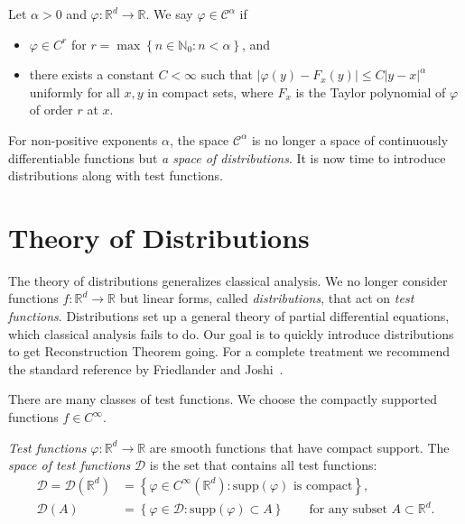 \begin{definition}\label{definition:hoelder-functions}
    Let \(\alpha > 0\) and \(\varphi: \mathbb{R}^d \to \mathbb{R}\). We say \(\varphi \in \mathcal{C}^{\alpha}\) if
\begin{itemize}
    \item \(\varphi \in C^r\) for \(r = \max \left \{ n \in \mathbb{N}_0 : n < \alpha \right \} \), and
    \item there exists a constant \(C < {\infty}\) such that \(|\varphi(y) - F_x(y)| \leq C |y-x|^{\alpha}\) uniformly for all \(x,y\) in compact sets, where \(F_x\) is the Taylor polynomial of \({\varphi}\) of order \(r\) at \(x\).   
\end{itemize}
\end{definition}
For non-positive exponents \( \alpha \), the space \( \mathcal{C}^\alpha \) is no longer a space of continuously differentiable functions but \emph{a space of distributions}. It is now time to introduce distributions along with test functions.


\section{Theory of Distributions}\label{chapter:distributions}

The theory of distributions generalizes classical analysis. We no longer consider functions \( f : \mathbb{R}^d \to \mathbb{R} \) but linear forms, called \emph{distributions}, that act on \emph{test functions}. Distributions set up a general theory of partial differential equations, which classical analysis fails to do. Our goal is to quickly introduce distributions to get Reconstruction Theorem going. For a complete treatment we recommend the standard reference by Friedlander and Joshi~\cite{friedlander1998introduction}.

There are many classes of test functions. We choose the compactly supported functions \( f \in C^\infty \).

\begin{definition}
    \emph{Test functions} \(\varphi: \mathbb{R}^d \to \mathbb{R}\) are smooth functions that have compact support. The \emph{space of test functions} \(\mathcal{D}\) is the set that contains all test functions:
    \begin{align*}
        \mathcal{D} = \mathcal{D}(\mathbb{R}^d) &= \left \{ \varphi \in C^\infty(\mathbb{R}^d) : \text{\(\mathrm{supp}(\varphi)\) is compact} \right \}, \\
        \mathcal{D}(A) &= \left \{ \varphi \in \mathcal{D} : \mathrm{supp}(\varphi) \subset A \right \} \qquad \text{for any subset \(A \subset \mathbb{R}^d\).}
    \end{align*}
\end{definition}

